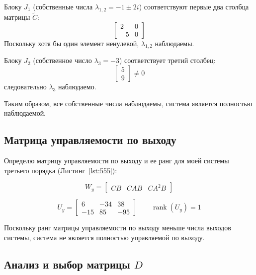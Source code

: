 \documentclass[a4paper,12pt]{article}
\begin{document}
	
	Блоку $J_1$ (собственные числа $\lambda_{1,2}=-1\pm2i$)
	соответствуют первые два столбца матрицы $\tilde{C}$:
	\[
	\begin{bmatrix}
		2 & 0\\
		-5 & 0
	\end{bmatrix}
	\]
	Поскольку хотя бы один элемент ненулевой, $\lambda_{1,2}$ наблюдаемы.
	
	Блоку $J_2$ (собственное число $\lambda_3=-3$)
	соответствует третий столбец:
	\[
	\begin{bmatrix}
		5\\
		9
	\end{bmatrix} \neq 0
	\]
	следовательно $\lambda_3$ наблюдаемо.
	
	Таким образом, все собственные числа наблюдаемы, система является полностью наблюдаемой.
	
	\subsection{Матрица управляемости по выходу}
	Определю матрицу управляемости по выходу и ее ранг для моей системы третьего порядка (Листинг~\ref{lst:555}):
	
	\[
	W_y =
	\begin{bmatrix}
		CB & CAB & CA^2B
	\end{bmatrix}
	\]
	
	\[
	U_y =
	\begin{bmatrix}
		6 & -34 & 38 \\
		-15 & 85 & -95
	\end{bmatrix}
	\qquad
	\operatorname{rank}(U_y)=1
	\]
	
	Поскольку ранг матрицы управляемости по выходу меньше числа выходов системы,
	система не является полностью управляемой по выходу.
	
	\subsection{Анализ и выбор матрицы $D$}
	
\end{document}
